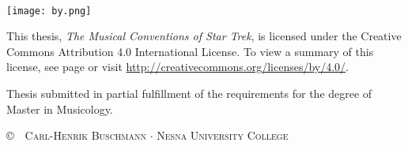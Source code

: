 ~\vfill
\thispagestyle{empty}

\begin{fullwidth}
\setlength\parindent{0pt}
\begin{minipage}{0.22\linewidth}
\texttt{[image: by.png]}
\end{minipage}
\begin{minipage}{0.8\linewidth}
This thesis, \textit{The Musical Conventions of Star Trek}, is licensed under the Creative Commons Attribution 4.0 International License. To view a summary of this license, see page \pageref{ch:creativecommons} or visit \url{http://creativecommons.org/licenses/by/4.0/}.
\end{minipage}

\vspace{0.5cm}

Thesis submitted in partial fulfillment of the requirements for the degree of Master in Musicology.

\vspace{0.5cm}

\textsc{\copyright\ \the\year\ Carl-Henrik Buschmann \(\cdot\) \textsc{Nesna University College}}

\end{fullwidth}

